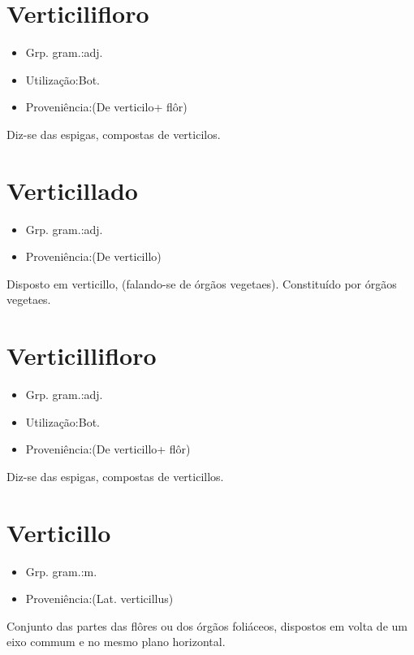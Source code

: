 \documentclass{article}
\begin{document}
\section{Verticilifloro}
\begin{itemize}
\item {Grp. gram.:adj.}
\end{itemize}
\begin{itemize}
\item {Utilização:Bot.}
\end{itemize}
\begin{itemize}
\item {Proveniência:(De \textunderscore verticilo\textunderscore  + \textunderscore flôr\textunderscore )}
\end{itemize}
Diz-se das espigas, compostas de verticilos.
\section{Verticillado}
\begin{itemize}
\item {Grp. gram.:adj.}
\end{itemize}
\begin{itemize}
\item {Proveniência:(De \textunderscore verticillo\textunderscore )}
\end{itemize}
Disposto em verticillo, (falando-se de órgãos vegetaes).
Constituído por órgãos vegetaes.
\section{Verticillifloro}
\begin{itemize}
\item {Grp. gram.:adj.}
\end{itemize}
\begin{itemize}
\item {Utilização:Bot.}
\end{itemize}
\begin{itemize}
\item {Proveniência:(De \textunderscore verticillo\textunderscore  + \textunderscore flôr\textunderscore )}
\end{itemize}
Diz-se das espigas, compostas de verticillos.
\section{Verticillo}
\begin{itemize}
\item {Grp. gram.:m.}
\end{itemize}
\begin{itemize}
\item {Proveniência:(Lat. \textunderscore verticillus\textunderscore )}
\end{itemize}
Conjunto das partes das flôres ou dos órgãos foliáceos, dispostos em volta de um eixo commum e no mesmo plano horizontal.
\end{document}
